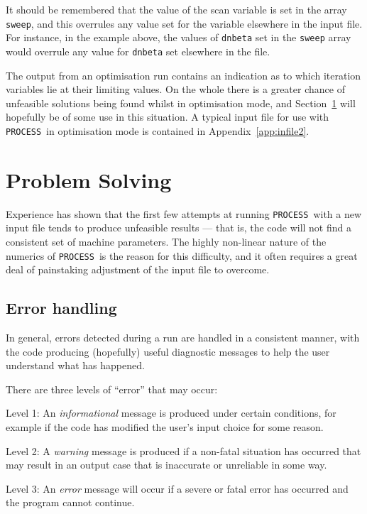\documentclass[11pt,a4paper]{report}
\newcommand{\process}{\mbox{\texttt{PROCESS}}}
\begin{document}
It should be remembered that the value of the scan variable is set in the
array \texttt{sweep}, and this overrules any value set for the variable
elsewhere in the input file. For instance, in the example above, the values of
\texttt{dnbeta} set in the \texttt{sweep} array would overrule any value for
\texttt{dnbeta} set elsewhere in the file.

The output from an optimisation run contains an indication as to which
iteration variables lie at their limiting values. On the whole there is a
greater chance of unfeasible solutions being found whilst in optimisation
mode, and Section~\ref{sec:problems} will hopefully be of some use in this
situation. A typical input file for use with \process\ in optimisation mode
is contained in Appendix~\ref{app:infile2}.

\section{Problem Solving}
\label{sec:problems}

Experience has shown that the first few attempts at running \process\ with a
new input file tends to produce unfeasible results --- that is, the code will
not find a consistent set of machine parameters. The highly non-linear nature
of the numerics of \process\ is the reason for this difficulty, and it often
requires a great deal of painstaking adjustment of the input file to overcome.

\subsection{Error handling}
\label{sec:errors}

In general, errors detected during a run are handled in a consistent manner,
with the code producing (hopefully) useful diagnostic messages to help the
user understand what has happened.

There are three levels of ``error'' that may occur:
\begin{description}

\item{Level 1:} An \textit{informational}\/ message is produced under certain
  conditions, for example if the code has modified the user's input choice for
  some reason.

\item{Level 2:} A \textit{warning}\/ message is produced if a non-fatal situation has
  occurred that may result in an output case that is inaccurate or
  unreliable in some way.

\item{Level 3:} An \textit{error}\/ message will occur if a severe or fatal
  error has occurred and the program cannot continue.

\end{description}
\end{document}
